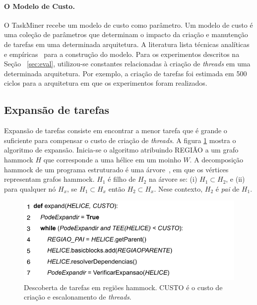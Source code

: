 \documentclass[sigplan,10pt,review]{acmart}
\newcommand\Taskminer{\mbox{\textsf{TaskMiner}}}
\begin{document}
\paragraph{O Modelo de Custo.}
O {\Taskminer} recebe um modelo de custo como parâmetro.
Um modelo de custo é uma coleção de parâmetros que determinam o impacto
da criação e manutenção de tarefas em uma determinada arquitetura.
A literatura lista técnicas analíticas e empíricas~\cite{Poesia17}
para a construção do modelo. 
Para os experimentos descritos na Seção ~\ref{sec:eval}, utilizou-se constantes
relacionadas à criação de {\em threads} em uma determinada arquitetura. Por exemplo,
a criação de tarefas foi estimada em 500 ciclos para a arquitetura em que os experimentos
foram realizados.

\subsection{Expansão de tarefas}
\label{sub:expansion}

Expansão de tarefas consiste em encontrar a menor tarefa que é grande o suficiente
para compensar o custo de criação de {\em threads}. A figura \ref{fig:expand_alg}
mostra o algoritmo de expansão. Inicia-se o algoritmo atribuindo \textsf{REGIÃO} a
um grafo hammock $H$ que corresponde a uma hélice em um moinho $W$.
A decomposição hammock de um programa estruturado é uma árvore~\cite{Ferrante87},
em que os vértices representam grafos hammock.
$H_1$ é filho de $H_2$ na árvore se:
(i) $H_1 \subset H_2$, e (ii) para qualquer 
nó $H_x$, se $H_1 \subset H_x$ então $H_2 \subset H_x$.
Nese contexto, $H_2$ é {\em pai} de $H_1$.

\begin{figure}[h]
\begin{center}
\includegraphics[width=1\columnwidth]{images/expand_alg}
\caption{Descoberta de tarefas em regiões hammock.
\textsf{CUSTO} é o custo de criação e escalonamento de {\em threads}.}
\label{fig:expand_alg}
\end{center}
\end{figure}
\end{document}
